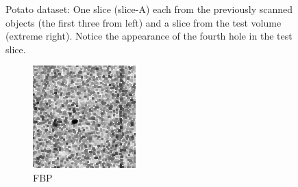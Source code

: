 \documentclass[journal]{IEEEtran}
\begin{document}
\begin{figure}[!h]
\begin{subfigure}[b]{0.235\linewidth}
\captionsetup{labelformat=empty}
        \caption{}
\label{fig:potato_test}
     \end{subfigure}
      \caption{Potato dataset: One slice (slice-A) each from the previously scanned objects (the first three from left) and a slice from the test 
        volume (extreme right). Notice the appearance of the fourth
        hole in the test slice. }
\label{fig:object-prior_test_potato_A1}
\end{figure}
\begin{figure}[!h]
    \begin{subfigure}[b]{0.24\linewidth}
        \includegraphics[width=\textwidth]{../images/potato/2D/weightsIm_fbp30.png}
        \caption{FBP}
    \end{subfigure}
    \begin{subfigure}[b]{0.24\linewidth}

\end{subfigure}
\end{figure}
\end{document}
